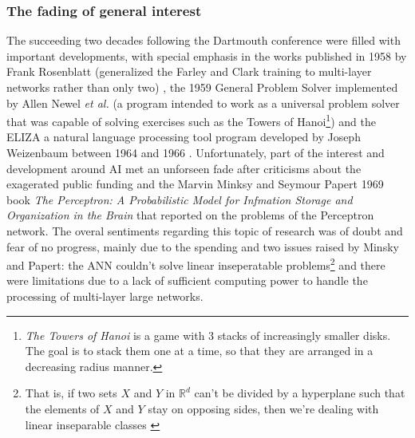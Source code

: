 \documentclass[a4paper, 12pt]{report}
\begin{document}
\subsubsection{The fading of general interest}
\par The succeeding two decades following the Dartmouth conference were filled with important developments, with special emphasis in the works published in 1958 by Frank Rosenblatt (generalized the Farley and Clark training to multi-layer networks rather than only two) \autocite{rosenblattPerceptronProbabilisticModel1958}, the 1959 General Problem Solver implemented by Allen Newel \textit{et al.} (a program intended to work as a universal problem solver that was capable of solving exercises such as the Towers of Hanoi\footnote{\textit{The Towers of Hanoi} is a game with 3 stacks of increasingly smaller disks. The goal is to stack them one at a time, so that they are arranged in a decreasing radius manner.}) \autocite{newell1959report} and the ELIZA a natural language processing tool program developed by Joseph Weizenbaum between 1964 and 1966 \autocite{weizenbaumELIZAComputerProgram1966}. Unfortunately, part of the interest and development around AI met an unforseen fade after criticisms about the exagerated public funding \autocite{haenleinBriefHistoryArtificial2019} and the Marvin Minksy and Seymour Papert 1969 book \textit{The Perceptron: A Probabilistic Model for Infmation Storage and Organization in the Brain} \autocite{minsky69perceptrons} that reported on the problems of the Perceptron network. The overal sentiments regarding this topic of research was of doubt and fear of no progress, mainly due to the spending and two issues raised by Minsky and Papert: the ANN couldn't solve linear inseperatable problems\footnote{That is, if two sets $X$ and $Y$ in $\mathbb{R}^d$ can't be divided by a hyperplane such that the elements of $X$ and $Y$ stay on opposing sides, then we're dealing with linear inseparable classes \autocite{elizondoLinearSeparabilityProblem2006}} and there were limitations due to a lack of sufficient computing power to handle the processing of multi-layer large networks.
\end{document}

